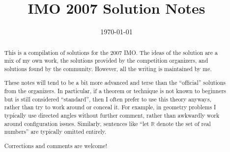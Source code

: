 \documentclass[11pt]{scrartcl}
\title{IMO 2007 Solution Notes}
\date{\today}
\begin{document}
\maketitle

\begin{abstract}
This is a compilation of solutions
for the 2007 IMO.
The ideas of the solution are a mix of my own work,
the solutions provided by the competition organizers,
and solutions found by the community.
However, all the writing is maintained by me.

These notes will tend to be a bit more advanced and terse than the ``official''
solutions from the organizers.
In particular, if a theorem or technique is not known to beginners
but is still considered ``standard'', then I often prefer to
use this theory anyways, rather than try to work around or conceal it.
For example, in geometry problems I typically use directed angles
without further comment, rather than awkwardly work around configuration issues.
Similarly, sentences like ``let $\mathbb{R}$ denote the set of real numbers''
are typically omitted entirely.

Corrections and comments are welcome!
\end{abstract}

\tableofcontents
\newpage

\addtocounter{section}{-1}
\end{document}
